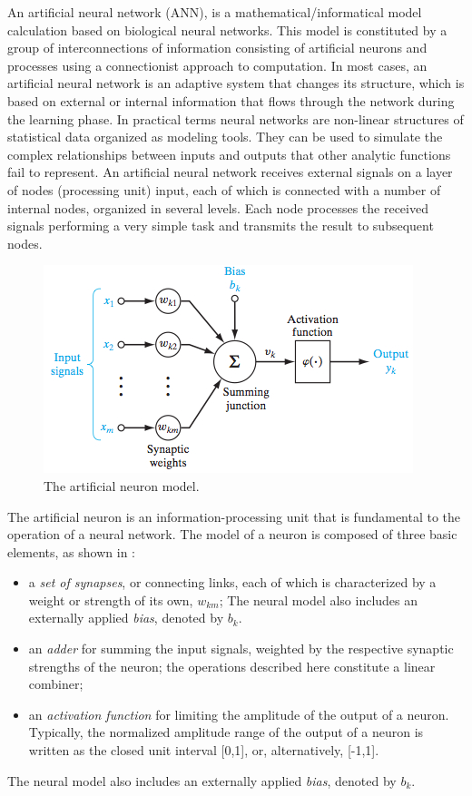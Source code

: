 An artificial neural network (ANN), is a mathematical/informatical model calculation based on biological neural networks.
This model is constituted by a group of interconnections of information consisting of artificial neurons and processes using a connectionist approach to computation. In most cases, an artificial neural network is an adaptive system that changes its structure, which is based on external or internal information that flows through the network during the learning phase. 
In practical terms neural networks are non-linear structures of statistical data organized as modeling tools.
They can be used to simulate the complex relationships between inputs and outputs that other analytic functions fail to represent.
An artificial neural network receives external signals on a layer of nodes (processing unit) input, each of which is connected with a number of internal nodes, organized in several levels. Each node processes the received signals performing a very simple task  and transmits the result to subsequent nodes. 
\begin{figure}[t]

	\centering
	\includegraphics[width=0.8\linewidth]{img/NeuronModel.jpg}
	\caption{The artificial neuron model.}
	\label{fig:artificial_neuron}
\end{figure}

The artificial neuron is an information-processing unit that is fundamental to the operation of a neural network. The model of a neuron is composed of three basic elements, as shown in : 
\begin{itemize}
	\item a \textit{set of synapses}, or connecting links, each of which is characterized by a weight or strength of its own, $w_{km}$; The neural model also includes an externally applied \textit{bias}, denoted by $b_k$.
	\item an \textit{adder} for summing the input signals, weighted by the respective synaptic strengths of the neuron; the operations described here constitute a linear combiner;
	\item an \textit{activation function} for limiting the amplitude of the output of a neuron. Typically, the normalized amplitude range of the output of a neuron is written as the closed unit interval [0,1], or, alternatively, [-1,1].
\end{itemize}
The neural model also includes an externally applied \textit{bias}, denoted by $b_k$.



